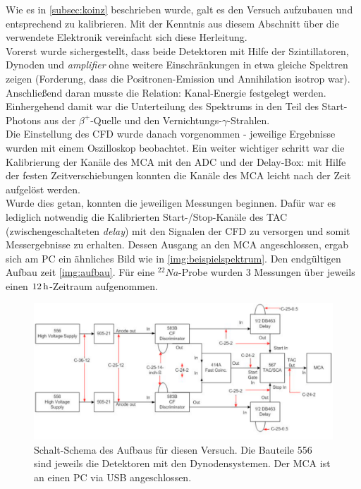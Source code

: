 \documentclass[numbers=noenddot,a4paper]{scrartcl}
\newcommand{\tilt}[1]{\textit{#1}}
\begin{document}
		Wie es in \ref{subsec:koinz} beschrieben wurde, galt es den Versuch aufzubauen und entsprechend zu kalibrieren. Mit der Kenntnis aus diesem Abschnitt über die verwendete Elektronik vereinfacht sich diese Herleitung.\\
		Vorerst wurde sichergestellt, dass beide Detektoren mit Hilfe der Szintillatoren, Dynoden und \tilt{amplifier} ohne weitere Einschränkungen in etwa gleiche Spektren zeigen (Forderung, dass die Positronen-Emission und Annihilation isotrop war). Anschließend daran musste die Relation: Kanal-Energie festgelegt werden. Einhergehend damit war die Unterteilung des Spektrums in den Teil des Start-Photons aus der $\beta^+$-Quelle und den Vernichtungs-$\gamma$-Strahlen. \\
		Die Einstellung des CFD wurde danach vorgenommen - jeweilige Ergebnisse wurden mit einem Oszilloskop beobachtet. Ein weiter wichtiger schritt war die Kalibrierung der Kanäle des MCA mit den ADC und der Delay-Box: mit Hilfe der festen Zeitverschiebungen konnten die Kanäle des MCA leicht nach der Zeit aufgelöst werden.\\
		Wurde dies getan, konnten die jeweiligen Messungen beginnen. Dafür war es lediglich notwendig die Kalibrierten Start-/Stop-Kanäle des TAC (zwischengeschalteten \tilt{delay}) mit den Signalen der CFD zu versorgen und somit Messergebnisse zu erhalten. Dessen Ausgang an den MCA angeschlossen, ergab sich am PC ein ähnliches Bild wie in \autoref{img:beispielspektrum}. Den endgültigen Aufbau zeit \autoref{img:aufbau}. Für eine $^{22}Na$-Probe wurden 3 Messungen über jeweils einen $\unit[12]{h}$-Zeitraum aufgenommen.

			\begin{figure}[t]
				\centering
				\includegraphics[width=\textwidth]{aufbau.png}
				\caption{Schalt-Schema des Aufbaus für diesen Versuch. Die Bauteile 556 sind jeweils die Detektoren mit den Dynodensystemen. Der MCA ist an einen PC via USB angeschlossen. \cite{EMAUGreifswaldPKO}}
				\label{img:aufbau}
			\end{figure}
\end{document}
